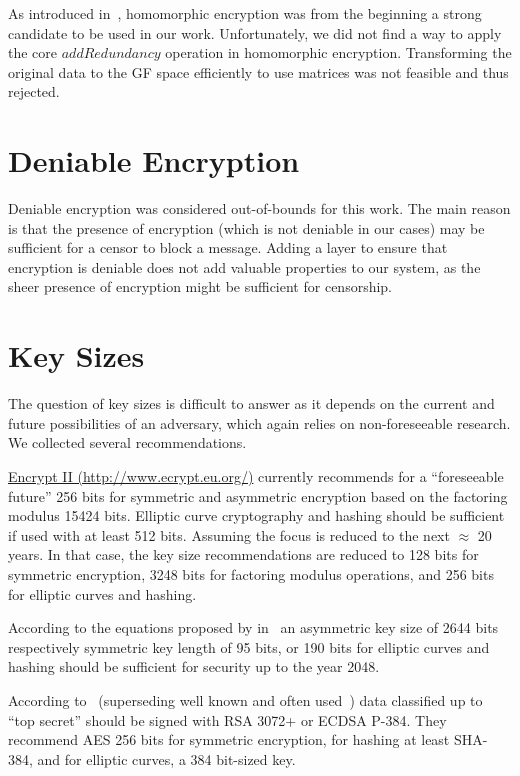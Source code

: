As introduced in~\cite{feldman1987practical}, homomorphic encryption was from the beginning a strong candidate to be used in our work. Unfortunately, we did not find a way to apply the core $addRedundancy$ operation in homomorphic encryption. Transforming the original data to the GF space efficiently to use matrices was not feasible and thus rejected.


\section{Deniable Encryption}
Deniable encryption was considered out-of-bounds for this work. The main reason is that the presence of encryption (which is not deniable in our cases) may be sufficient for a censor to block a message. Adding a layer to ensure that encryption is deniable does not add valuable properties to our system, as the sheer presence of encryption might be sufficient for censorship. 

\section{Key Sizes}\label{sec:keySize}
The question of key sizes is difficult to answer as it depends on the current and future possibilities of an adversary, which again relies on non-foreseeable research. We collected several recommendations.

\href{http://www.ecrypt.eu.org/}{Encrypt II (http://www.ecrypt.eu.org/)} currently recommends for a ``foreseeable future'' 256 bits for symmetric and  asymmetric encryption based on the factoring modulus 15424 bits. Elliptic curve cryptography and hashing should be sufficient if used with at least 512 bits. Assuming the focus is reduced to the next $\approx$ 20 years. In that case, the key size recommendations are reduced to 128 bits for symmetric encryption, 3248 bits for factoring modulus operations, and 256 bits for elliptic curves and hashing.

According to the equations proposed by \citeauthor{Lenstra04keylength.} in~\cite{Lenstra04keylength.} an asymmetric key size of 2644 bits respectively symmetric key length of 95 bits, or 190 bits for elliptic curves and hashing should be sufficient for security up to the year 2048. 

According to~\cite{CNSASuite} (superseding well known and often used~\cite{nsa-fact-sheet-B}) data classified up to ``top secret'' should be signed with RSA 3072+ or ECDSA P-384.  They recommend AES 256 bits for symmetric encryption, for hashing at least SHA-384, and for elliptic curves, a 384 bit-sized key.


